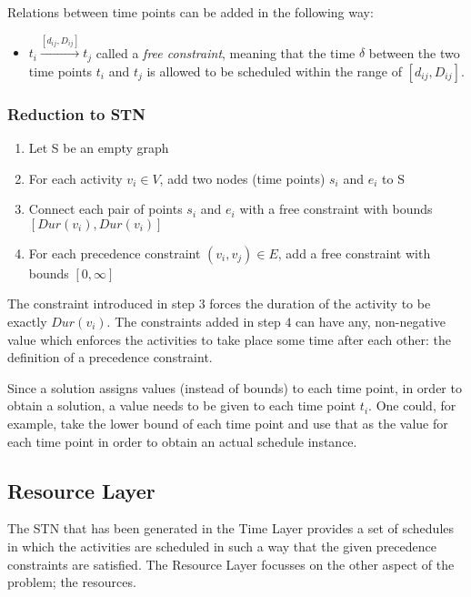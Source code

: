 \documentclass{article}
\newcommand{\dur}[1]{\textit{Dur}(#1)} %
\begin{document}
Relations between time points can be added in the following way:
\begin{itemize}
\item $t_i \xrightarrow{[d_{ij},D_{ij}]} t_j$ called a \emph{free constraint}, meaning that the time $\delta$ between the two time points $t_i$ and $t_j$ is allowed to be scheduled within the range of $[d_{ij},D_{ij}]$.
\end{itemize}

\subsubsection{Reduction to STN}
\begin{enumerate}
\item Let S be an empty graph
\item For each activity $v_i \in V$, add two nodes (time points) $s_i$ and $e_i$ to S
\item Connect each pair of points $s_i$ and $e_i$ with a free constraint with bounds $[\dur{v_i}, \dur{v_i}]$
\item For each precedence constraint $(v_i, v_j) \in E$, add a free constraint with bounds $[0, \infty]$
\end{enumerate}

The constraint introduced in step $3$ forces the duration of the activity to be exactly $\dur{v_i}$. The constraints added in step $4$ can have any, non-negative value which enforces the activities to take place some time after each other: the definition of a precedence constraint.

Since a solution assigns values (instead of bounds) to each time point, in order to obtain a solution, a value needs to be given to each time point $t_i$.
One could, for example, take the lower bound of each time point and use that as the value for each time point in order to obtain an actual schedule instance.

\subsection{Resource Layer}
The STN that has been generated in the Time Layer provides a set of schedules in which the activities are scheduled in such a way that the given precedence constraints are satisfied. The Resource Layer focusses on the other aspect of the problem; the resources. 
\end{document}
